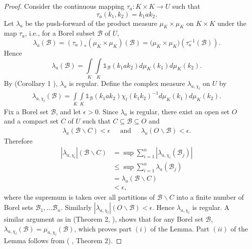 \documentclass[11pt,a4paper]{amsart}
\theoremstyle{definition}
\numberwithin{equation}{section}
\begin{document}
\begin{proof}
	
	Consider the continuous mapping $ \tau_a:K\times K \longrightarrow U$ such that $$ \tau_a(k_1,k_2)=k_1ak_2.$$ Let $\lambda_{a}$ be the push-forward of the product measure $\mu_K \times \mu_K$ on $K \times K$ under the map $\tau_a$, i.e., for a Borel subset $\mathscr{B}$ of $U$,
	$$
	\lambda_{a}\left( \mathscr{B}\right) =\left( \tau_a\right) _*\left( \mu_K \times \mu_K\right)\left(\mathscr{B} \right)= \big(\mu_K \times \mu_K\big)\left(\tau_a^{-1}\left( \mathscr{B}\right)  \right).   
	$$
	Hence
	$$
	\lambda_{a}\left( \mathscr{B}\right)=\int\limits_{K}\int\limits_{K}{\mathds{1}}_\mathscr{B}\left(  k_{1}%
	ak_{2}\right)   d\mu_K\left(  k_{1}\right)  d\mu_K\left(  k_{2}\right) .
	$$
	By   (Corollary 1 \cite{Stromberg}), $ \lambda_{a}$ is regular.
	Define the complex measure $ \lambda_{a, \chi_l}$ on $U$ by  \begin{align*}
	\lambda_{a, \chi_l}(\mathscr{B})= \int\limits_{K}\int\limits_{K}{\mathds{1}}_\mathscr{B}\left(  k_{1}%
	ak_{2}\right) \chi_l\left(k_1k_2 \right)^{-1}   d\mu_K\left(  k_{1}\right)  d\mu_K\left(  k_{2}\right).
	\end{align*}
	Fix a Borel set $\mathscr{B}$, and let $\epsilon>0$. Since $\lambda_{a}$ is regular, there exist an open set $O$ and a compact set $C$ of $U$ such that $C\subseteq \mathscr{B} \subseteq O$ and 
	 \begin{align*}
	\lambda_{a}(\mathscr{B} \backslash C) < \epsilon \;\;\;\; \text{ and } \;\;\;\;  \lambda_{a}(O \backslash \mathscr{B} )< \epsilon. 
	\end{align*}   
    Therefore
    \begin{align*}
	|\lambda_{a, \chi_l}|(\mathscr{B} \backslash C)&= \sup   \sum _{i=1}^n\left|\lambda_{a, \chi_l} ( \mathscr{B}_j)\right| \\&\leq \sup   \sum _{i=1}^n\lambda_{a} ( \mathscr{B}_j) \\ &=\lambda_{a}(\mathscr{B} \backslash C) \\&<\epsilon,
	\end{align*} where the supremum is taken over all partitions of $\mathscr{B}\backslash C$  into a finite number of Borel sets $\mathscr{B}_1,\dots \mathscr{B}_n$. Similarly $ |\lambda_{a, \chi_l}|(O \backslash \mathscr{B})< \epsilon$. Hence $\lambda_{a, \chi_l}$ is regular. A similar  argument as in (Theorem 2, \cite{Stromberg}), shows that for any Borel set $\mathscr{B}$, \\ $\lambda_{a, \chi_l}(\mathscr{B}) = \mu_{a, \chi_l}(\mathscr{B})
	$, which proves part $(i)$ of the Lemma. Part $(ii)$ of the Lemma  follows from  ( \cite{Stromberg}, Theorem 2).
\end{proof}
\end{document}
